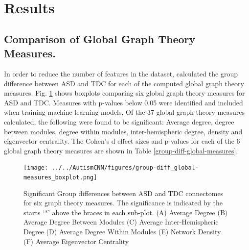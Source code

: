 \documentclass[10pt,conference]{IEEEtran}
\begin{document}
\section{Results}

    \subsection{Comparison of Global Graph Theory Measures.} 
    In order to reduce the number of features in the dataset, calculated the group 
    difference between ASD and TDC for each of the computed global graph theory measures.
    Fig. \ref{group-diff-boxplot-global-measures} shows boxplots comparing six global graph
    theory measures for ASD and TDC. Measures with p-values below 0.05 were identified and
    included when training machine learning models. Of the 37 global graph theory measures
    calculated, the following were found to be significant: Average degree, 
    degree between modules, degree within modules, inter-hemispheric degree, density and 
    eigenvector centrality. The Cohen's d effect sizes and p-values for each of the 6 
    global graph theory measures are shown in Table \ref{group-diff-global-measures}.

    \begin{figure}[ht]
        \vskip 0.2in
        \begin{center}
            \centerline{\texttt{[image: ../../AutismCNN/figures/group-diff\_global-measures\_boxplot.png]}}
            \caption{
                Significant Group differences between ASD and TDC connectomes for six graph
                theory measures. The significance is indicated by the starts `*' above the
                braces in each sub-plot. (A) Average Degree (B) Average Degree Between Modules
                (C) Average Inter-Hemispheric Degree (D) Average Degree Within Modules
                (E) Network Density (F) Average Eigenvector Centrality
            }
            \label{group-diff-boxplot-global-measures}
        \end{center}
        \vskip -0.2in
    \end{figure}
\end{document}
